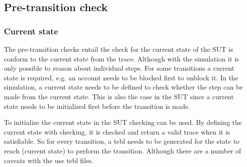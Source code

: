\subsection{Pre-transition check}

\subsubsection*{Current state}
\label{sec:ch5-current-state}

The pre-transition checks entail the check for the current state of the SUT is conform to the current state from the trace. Although with the simulation it is only possible to reason about individual steps. For some transitions a current state is required, e.g. an account needs to be blocked first to unblock it. In the simulation, a current state needs to be defined to check whether the step can be made from the current state. This is also the case in the SUT since a current state needs to be initialized first before the transition is made.

To initialize the current state in the SUT checking can be used. By defining the current state with checking, it is checked and return a valid trace when it is satisfiable. So for every transition, a tebl needs to be generated for the state to reach (current state) to perform the transition. Although there are a number of caveats with the use tebl files.

